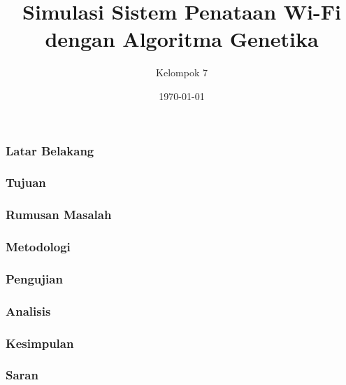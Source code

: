 \documentclass[12pt]{beamer}
\author{Kelompok 7}
\title{Simulasi Sistem Penataan Wi-Fi dengan Algoritma Genetika}
\institute{Sarjana Teknik Informatika Universitas Telkom}
\date{\today}
\begin{document}
	\maketitle
	
	\begin{frame}
		\frametitle{Latar Belakang}
	\end{frame}
	
	\begin{frame}
		\frametitle{Tujuan}
	\end{frame}
	
	\begin{frame}
		\frametitle{Rumusan Masalah}
	\end{frame}
	
	\begin{frame}
		\frametitle{Metodologi}
	\end{frame}
	
	\begin{frame}
		\frametitle{Pengujian}
	\end{frame}
	
	\begin{frame}
		\frametitle{Analisis}
	\end{frame}
	
	\begin{frame}
		\frametitle{Kesimpulan}
	\end{frame}
	
	\begin{frame}
		\frametitle{Saran}
	\end{frame}
\end{document}
